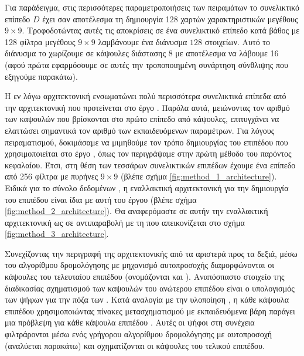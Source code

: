 Για παράδειγμα, στις περισσότερες παραμετροποιήσεις των πειραμάτων το συνελικτικό επίπεδο $D$ έχει σαν αποτέλεσμα τη δημιουργία 128 χαρτών χαρακτηριστικών μεγέθους $9 \times 9$. Τροφοδοτώντας αυτές τις αποκρίσεις σε ένα συνελικτικό επίπεδο κατά βάθος με 128 φίλτρα μεγέθους $9 \times 9$ λαμβάνουμε ένα διάνυσμα $128$ στοιχείων. Αυτό το διάνυσμα το χωρίζουμε σε κάψουλες διάστασης 8 με αποτέλεσμα να λάβουμε 16  (αφού πρώτα εφαρμόσουμε σε αυτές την τροποποιημένη συνάρτηση σύνθλιψης που εξηγούμε παρακάτω).\par

Η εν λόγω αρχιτεκτονική ενσωματώνει πολύ περισσότερα συνελικτικά επίπεδα από την αρχιτεκτονική που προτείνεται στο έργο \cite{sabour2017dynamic}. Παρόλα αυτά, μειώνοντας τον αριθμό των καψουλών που βρίσκονται στο πρώτο επίπεδο από κάψουλες, επιτυγχάνει να ελαττώσει σημαντικά τον αριθμό των εκπαιδευόμενων παραμέτρων. Για λόγους πειραματισμού, δοκιμάσαμε να μιμηθούμε τον τρόπο δημιουργίας του επιπέδου  που χρησιμοποιείται στο έργο \cite{sabour2017dynamic}, όπως τον περιγράψαμε στην πρώτη μέθοδο του παρόντος κεφαλαίου. Έτσι, στη θέση των τεσσάρων συνελικτικών επιπέδων έχουμε ένα επίπεδο από 256 φίλτρα με πυρήνες $9 \times 9$ (βλέπε σχήμα \ref{fig:method_1_architecture}). Ειδικά για το σύνολο δεδομένων , η εναλλακτική αρχιτεκτονική για την δημιουργία του επιπέδου  είναι ίδια με αυτή του έργου \cite{hinton2018matrix} (βλέπε σχήμα \ref{fig:method_2_architecture}). Θα αναφερόμαστε σε αυτήν την εναλλακτική αρχιτεκτονική ως  σε αντιπαραβολή με τη  που απεικονίζεται στο σχήμα \ref{fig:method_3_architecture}.\par

Συνεχίζοντας την περιγραφή της αρχιτεκτονικής από τα αριστερά προς τα δεξιά, μέσω του αλγορίθμου δρομολόγησης με μηχανισμό αυτο\textendash προσοχής διαμορφώνονται οι κάψουλες του τελευταίου επιπέδου (ονομάζονται και ). Αναπόσπαστο στοιχείο της διαδικασίας σχηματισμού των καψουλών του ανώτερου επιπέδου είναι ο υπολογισμός των ψήφων για την πόζα των . Κατά αναλογία με την υλοποίηση \cite{sabour2017dynamic}, η κάθε κάψουλα επιπέδου  χρησιμοποιώντας πίνακες μετασχηματισμού με εκπαιδευόμενα βάρη παράγει μια πρόβλεψη για κάθε κάψουλα επιπέδου . Αυτές οι ψήφοι στη συνέχεια φιλτράρονται μέσω ενός γρήγορου αλγορίθμου δρομολόγησης με αυτο\textendash προσοχή (αναλύεται παρακάτω) και σχηματίζονται οι κάψουλες του τελικού επιπέδου.

